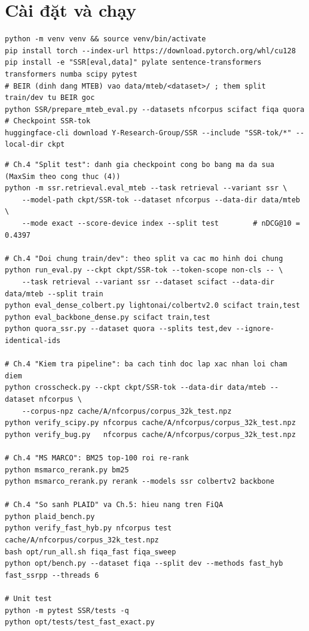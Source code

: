 \documentclass[a4paper,13pt]{extreport}
\theoremstyle{plain}
\begin{document}
\section{Cài đặt và chạy}
\begin{lstlisting}[style=shell, caption={Cài đặt môi trường, dữ liệu và checkpoint.}]
python -m venv venv && source venv/bin/activate
pip install torch --index-url https://download.pytorch.org/whl/cu128
pip install -e "SSR[eval,data]" pylate sentence-transformers transformers numba scipy pytest
# BEIR (dinh dang MTEB) vao data/mteb/<dataset>/ ; them split train/dev tu BEIR goc
python SSR/prepare_mteb_eval.py --datasets nfcorpus scifact fiqa quora
# Checkpoint SSR-tok
huggingface-cli download Y-Research-Group/SSR --include "SSR-tok/*" --local-dir ckpt
\end{lstlisting}
\begin{lstlisting}[style=shell, caption={Các thí nghiệm chính (tên mục tương ứng trong Chương 4 và 5).}]
# Ch.4 "Split test": danh gia checkpoint cong bo bang ma da sua (MaxSim theo cong thuc (4))
python -m ssr.retrieval.eval_mteb --task retrieval --variant ssr \
    --model-path ckpt/SSR-tok --dataset nfcorpus --data-dir data/mteb \
    --mode exact --score-device index --split test        # nDCG@10 = 0.4397

# Ch.4 "Doi chung train/dev": theo split va cac mo hinh doi chung
python run_eval.py --ckpt ckpt/SSR-tok --token-scope non-cls -- \
    --task retrieval --variant ssr --dataset scifact --data-dir data/mteb --split train
python eval_dense_colbert.py lightonai/colbertv2.0 scifact train,test
python eval_backbone_dense.py scifact train,test
python quora_ssr.py --dataset quora --splits test,dev --ignore-identical-ids

# Ch.4 "Kiem tra pipeline": ba cach tinh doc lap xac nhan loi cham diem
python crosscheck.py --ckpt ckpt/SSR-tok --data-dir data/mteb --dataset nfcorpus \
    --corpus-npz cache/A/nfcorpus/corpus_32k_test.npz
python verify_scipy.py nfcorpus cache/A/nfcorpus/corpus_32k_test.npz
python verify_bug.py   nfcorpus cache/A/nfcorpus/corpus_32k_test.npz

# Ch.4 "MS MARCO": BM25 top-100 roi re-rank
python msmarco_rerank.py bm25
python msmarco_rerank.py rerank --models ssr colbertv2 backbone

# Ch.4 "So sanh PLAID" va Ch.5: hieu nang tren FiQA
python plaid_bench.py
python verify_fast_hyb.py nfcorpus test cache/A/nfcorpus/corpus_32k_test.npz
bash opt/run_all.sh fiqa_fast fiqa_sweep
python opt/bench.py --dataset fiqa --split dev --methods fast_hyb fast_ssrpp --threads 6

# Unit test
python -m pytest SSR/tests -q
python opt/tests/test_fast_exact.py
\end{lstlisting}
\end{document}
